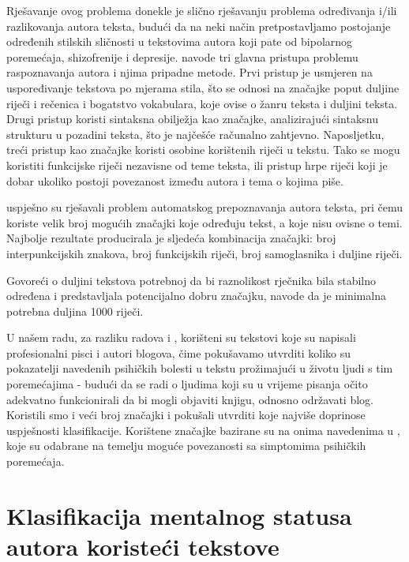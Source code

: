 \documentclass[10pt, a4paper]{article}
\begin{document}
Rješavanje ovog problema donekle je slično rješavanju problema određivanja i/ili razlikovanja autora teksta, budući da na neki način pretpostavljamo postojanje određenih stilskih sličnosti u tekstovima autora koji pate od bipolarnog poremećaja, shizofrenije i depresije. \citet{coyotl} navode tri glavna pristupa problemu raspoznavanja autora i njima pripadne metode. Prvi pristup je usmjeren na uspoređivanje tekstova po mjerama stila, što se odnosi na značajke poput duljine riječi i rečenica i bogatstvo vokabulara, koje ovise o žanru teksta i duljini teksta. Drugi pristup koristi sintaksna obilježja kao značajke, analizirajući sintaksnu strukturu u pozadini teksta, što je najčešće računalno zahtjevno. Naposljetku, treći pristup kao značajke koristi osobine korištenih riječi u tekstu. Tako se mogu koristiti funkcijske riječi nezavisne od teme teksta, ili pristup hrpe riječi koji je dobar ukoliko postoji povezanost između autora i tema o kojima piše.


\citet{kristo} uspješno su rješavali problem automatskog prepoznavanja autora teksta, pri čemu koriste velik broj mogućih značajki koje određuju tekst, a koje nisu ovisne o temi. Najbolje rezultate producirala je sljedeća kombinacija značajki: broj interpunkcijskih znakova, broj funkcijskih riječi, broj samoglasnika i duljine riječi.

Govoreći o duljini tekstova potrebnoj da bi raznolikost rječnika bila stabilno određena i predstavljala potencijalno dobru značajku, \citet{tweedie} navode da je minimalna potrebna duljina 1000 riječi.

U našem radu, za razliku radova \citep{strous-2009} i \citep{exray}, korišteni su tekstovi koje su napisali profesionalni pisci i autori blogova, čime pokušavamo utvrditi koliko su pokazatelji navedenih psihičkih bolesti u tekstu prožimajući u životu ljudi s tim poremećajima - budući da se radi o ljudima koji su u vrijeme pisanja očito adekvatno funkcionirali da bi mogli objaviti knjigu, odnosno održavati blog. Koristili smo i veći broj značajki i pokušali utvrditi koje najviše doprinose uspješnosti klasifikacije. Korištene značajke bazirane su na onima navedenima u \citep{kristo}, koje su odabrane na temelju moguće povezanosti sa simptomima psihičkih poremećaja.


\section{Klasifikacija mentalnog statusa autora koristeći tekstove}
\end{document}
